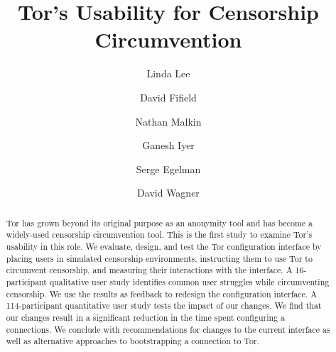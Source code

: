 \documentclass[USenglish,oneside,twocolumn]{article}
\begin{document}
 
  \author*[1]{Linda Lee}

  \author[2]{David Fifield}

  \author[3]{Nathan Malkin}

  \author[4]{Ganesh Iyer}

  \author[5]{Serge Egelman}
  
  \author[6]{David Wagner}




  
   

  \title{\huge Tor's Usability for Censorship Circumvention}



  \begin{abstract}
{Tor has grown beyond its original purpose as an anonymity tool and has 
become a widely-used censorship circumvention tool.
This is the first study to examine Tor's usability in this role.
We evaluate, design, and test the Tor configuration interface by
placing users in simulated censorship environments, instructing them to use Tor
to circumvent censorship, and measuring their interactions with the interface.
A 16-participant qualitative user study identifies common user struggles while circumventing censorship.
We use the results as feedback to redesign the configuration interface.
A 114-participant quantitative user study tests the impact of our changes.
We find that our changes result in a significant reduction 
in the time spent configuring a connections. We
conclude with recommendations for changes to the current interface as well as 
alternative approaches to bootstrapping a connection to Tor.}
\end{abstract}
\end{document}

